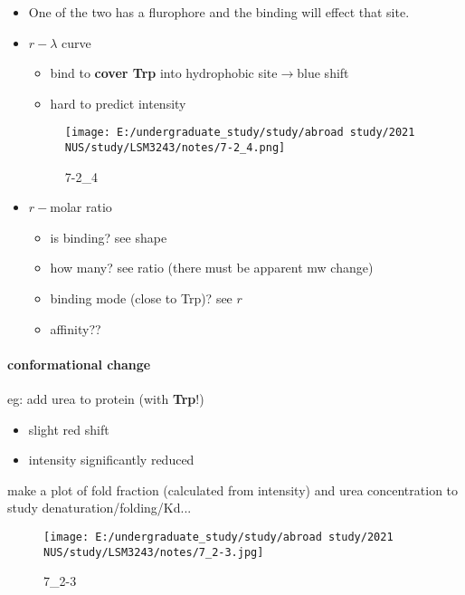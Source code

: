 \documentclass[]{article}
\let\oldparagraph\paragraph
\renewcommand{\paragraph}[1]{\oldparagraph{#1}\mbox{}}
\begin{document}
\begin{itemize}
\item
  One of the two has a flurophore and the binding will effect that site.
\item
  \(r-\lambda\) curve

  \begin{itemize}
  \item
    bind to \textbf{cover Trp} into hydrophobic
    site\(\longrightarrow\)blue shift
  \item
    hard to predict intensity
  \end{itemize}

  \begin{figure}
  \centering
  \texttt{[image: E:/undergraduate\_study/study/abroad study/2021 NUS/study/LSM3243/notes/7-2\_4.png]}
  \caption{7-2\_4}
  \end{figure}
\item
  \(r-\)molar ratio

  \begin{itemize}
  \item
    is binding? see shape
  \item
    how many? see ratio (there must be apparent mw change)
  \item
    binding mode (close to Trp)? see \(r\)
  \item
    affinity??
  \end{itemize}
\end{itemize}

\hypertarget{conformational-change}{%
\paragraph{conformational change}\label{conformational-change}}

eg: add urea to protein (with \textbf{Trp}!)

\begin{itemize}
\item
  slight red shift
\item
  intensity significantly reduced
\end{itemize}

make a plot of fold fraction (calculated from intensity) and urea
concentration to study denaturation/folding/Kd...

\begin{figure}
\centering
\texttt{[image: E:/undergraduate\_study/study/abroad study/2021 NUS/study/LSM3243/notes/7\_2-3.jpg]}
\caption{7\_2-3}
\end{figure}
\end{document}
